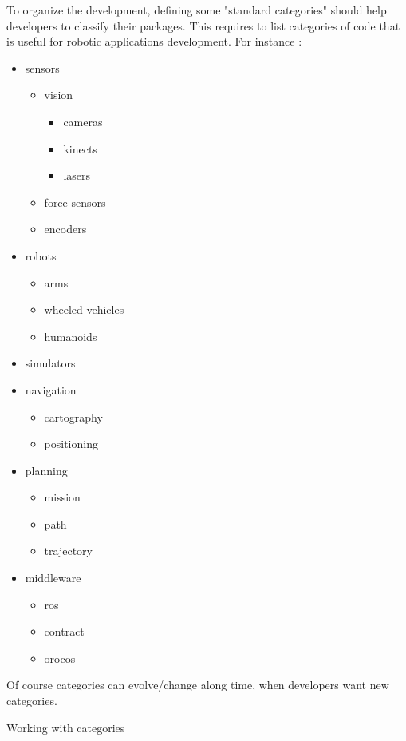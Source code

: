 \documentclass[12pt,a4paper]{article}
\begin{document}
To organize the development, defining some "standard categories" should help developers to classify their packages. This requires to list categories of code that is useful for robotic applications development. For instance :
\begin{itemize}
\item sensors
\begin{itemize}
\item vision
\begin{itemize}
\item cameras
\item kinects
\item lasers
\end{itemize}
\item force sensors
\item encoders
\end{itemize}
\item robots
\begin{itemize}
\item arms
\item wheeled vehicles
\item humanoids
\end{itemize}
\item simulators
\item navigation
\begin{itemize}
\item cartography
\item positioning
\end{itemize}
\item planning
\begin{itemize}
\item mission
\item path
\item trajectory
\end{itemize}
\item middleware
\begin{itemize}
\item ros
\item contract
\item orocos
\end{itemize}
\end{itemize}

Of course categories can evolve/change along time, when developers want new categories.

Working with categories
\end{document}

